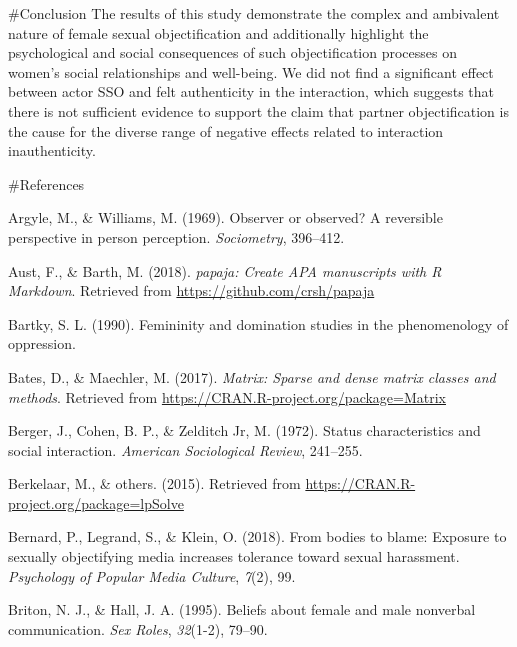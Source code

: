 \documentclass[
  man]{apa6}
\begin{document}
\#Conclusion
The results of this study demonstrate the complex and ambivalent nature of female sexual objectification and additionally highlight the psychological and social consequences of such objectification processes on women's social relationships and well-being. We did not find a significant effect between actor SSO and felt authenticity in the interaction, which suggests that there is not sufficient evidence to support the claim that partner objectification is the cause for the diverse range of negative effects related to interaction inauthenticity.

\#References

\newpage

\begingroup
\setlength{\parindent}{-0.5in}
\setlength{\leftskip}{0.5in}

\hypertarget{refs}{}
\leavevmode\hypertarget{ref-argyle1969}{}%
Argyle, M., \& Williams, M. (1969). Observer or observed? A reversible perspective in person perception. \emph{Sociometry}, 396--412.

\leavevmode\hypertarget{ref-R-papaja}{}%
Aust, F., \& Barth, M. (2018). \emph{papaja: Create APA manuscripts with R Markdown}. Retrieved from \url{https://github.com/crsh/papaja}

\leavevmode\hypertarget{ref-Bartky}{}%
Bartky, S. L. (1990). Femininity and domination studies in the phenomenology of oppression.

\leavevmode\hypertarget{ref-R-Matrix}{}%
Bates, D., \& Maechler, M. (2017). \emph{Matrix: Sparse and dense matrix classes and methods}. Retrieved from \url{https://CRAN.R-project.org/package=Matrix}

\leavevmode\hypertarget{ref-berger1972}{}%
Berger, J., Cohen, B. P., \& Zelditch Jr, M. (1972). Status characteristics and social interaction. \emph{American Sociological Review}, 241--255.

\leavevmode\hypertarget{ref-R-lpSolve}{}%
Berkelaar, M., \& others. (2015). Retrieved from \url{https://CRAN.R-project.org/package=lpSolve}

\leavevmode\hypertarget{ref-bernard2018bodies}{}%
Bernard, P., Legrand, S., \& Klein, O. (2018). From bodies to blame: Exposure to sexually objectifying media increases tolerance toward sexual harassment. \emph{Psychology of Popular Media Culture}, \emph{7}(2), 99.

\leavevmode\hypertarget{ref-briton1995}{}%
Briton, N. J., \& Hall, J. A. (1995). Beliefs about female and male nonverbal communication. \emph{Sex Roles}, \emph{32}(1-2), 79--90.
\end{document}
